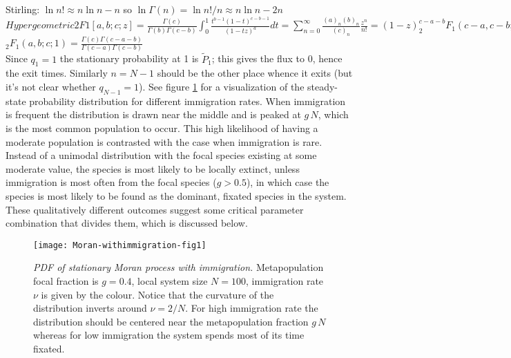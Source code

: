 Stirling: $\ln n! \approx n \ln n - n$ so $\ln \Gamma(n) = \ln n!/n \approx n\ln n - 2n$ \\
$Hypergeometric2F1[a,b;c;z] = \frac{\Gamma(c)}{\Gamma(b)\Gamma(c-b)} \int_0^1 \frac{t^{b-1}(1-t)^{c-b-1}}{(1-t z)^{a}}dt = \sum_{n=0}^\infty \frac{(a)_n (b)_n}{(c)_n}\frac{z^n}{n!} = (1-z)^{c-a-b} _{2}F_1(c-a,c-b;c;z)$ \\
$_2F_1(a,b;c;1) = \frac{\Gamma(c)\Gamma(c-a-b)}{\Gamma(c-a)\Gamma(c-b)}$ \\
Since $q_1=1$ the stationary probability at 1 is $\widetilde{P}_1$; this gives the flux to 0, hence the exit times. 
Similarly $n=N-1$ should be the other place whence it exits (but it's not clear whether $q_{N-1}=1$). 
\fi
See figure \ref{stationary-fig2} for a visualization of the steady-state probability distribution for different immigration rates. %
When immigration is frequent the distribution is drawn near the middle and is peaked at $g\,N$, which is the most common population to occur. 
This high likelihood of having a moderate population is contrasted with the case when immigration is rare. 
Instead of a unimodal distribution with the focal species existing at some moderate value, the species is most likely to be locally extinct, unless immigration is most often from the focal species ($g>0.5$), in which case the species is most likely to be found as the dominant, fixated species in the system. 
These qualitatively different outcomes suggest some critical parameter combination that divides them, which is discussed below. 
\setlength{\unitlength}{1.0cm}
\begin{figure}[h]
	\centering
	\texttt{[image: Moran-withimmigration-fig1]}
	\caption{\emph{PDF of stationary Moran process with immigration.} Metapopulation focal fraction is $g=0.4$, local system size $N=100$, immigration rate $\nu$ is given by the colour. Notice that the curvature of the distribution inverts around $\nu=2/N$. For high immigration rate the distribution should be centered near the metapopulation fraction $g\,N$ whereas for low immigration the system spends most of its time fixated. } \label{stationary-fig2}
\end{figure}

